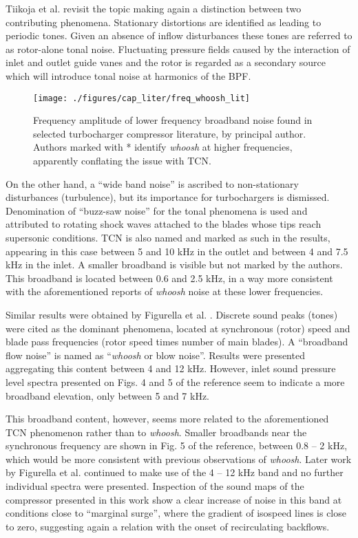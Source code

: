 Tiikoja et al. \cite{tiikoja2011inves} revisit the topic making again a distinction between two contributing phenomena. Stationary distortions are identified as leading to periodic tones. Given an absence of inflow disturbances these tones are referred to as rotor-alone tonal noise. Fluctuating pressure fields caused by the interaction of inlet and outlet guide vanes and the rotor is regarded as a secondary source which will introduce tonal noise at harmonics of the BPF. 

\begin{wrapfigure}{o}[1.5cm]{0.4\textwidth}
\centering
\vspace{2mm}
\texttt{[image: ./figures/cap\_liter/freq\_whoosh\_lit]}
\caption{Frequency amplitude of lower frequency broadband noise found in selected turbocharger compressor literature, by principal author. Authors marked with * identify \emph{whoosh} at higher frequencies, apparently conflating the issue with TCN.}
\label{fig:freq_whoosh_lit}
\end{wrapfigure}

On the other hand, a ``wide band noise'' is ascribed to non-stationary disturbances (turbulence), but its importance for turbochargers is dismissed. Denomination of ``buzz-saw noise'' for the tonal phenomena is used and attributed to rotating shock waves attached to the blades whose tips reach supersonic conditions. TCN is also named and marked as such in the results, appearing in this case between 5 and 10 kHz in the outlet and between 4 and 7.5 kHz in the inlet. A smaller broadband is visible but not marked by the authors. This broadband is located between 0.6 and 2.5 kHz, in a way more consistent with the aforementioned reports of \emph{whoosh} noise at these lower frequencies.

Similar results were obtained by Figurella et al. \cite{figurella2012noise}. Discrete sound peaks (tones) were cited as the dominant phenomena, located at synchronous (rotor) speed and blade pass frequencies (rotor speed times number of main blades). A ``broadband flow noise'' is named as ``\emph{whoosh} or blow noise''. Results were presented aggregating this content between 4 and 12 kHz. However, inlet sound pressure level spectra presented on Figs. 4 and 5 of the reference seem to indicate a more broadband elevation, only between 5 and 7 kHz. 

This broadband content, however, seems more related to the aforementioned TCN phenomenon rather than to \emph{whoosh}. Smaller broadbands near the synchronous frequency are shown in Fig. 5 of the reference, between 0.8 -- 2 kHz, which would be more consistent with previous observations of \emph{whoosh}. Later work by Figurella et al. \cite{figurella2014effect} continued to make use of the 4 -- 12 kHz band and no further individual spectra were presented. Inspection of the sound maps of the compressor presented in this work show a clear increase of noise in this band at conditions close to ``marginal surge'', where the gradient of isospeed lines is close to zero, suggesting again a relation with the onset of recirculating backflows.


